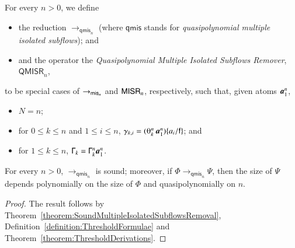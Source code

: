 \newcommand{\frqmis}{{\mathsf{qmis}}}
\newcommand{\QMISR}{\mathsf{QMISR}}
\begin{definition}\label{definition:QuasipolynomialMultipleSubflowRemoval}
For every $n>0$, we define
\begin{itemize}
\item the reduction ${\to_{\frqmis_n}}$ (where $\frqmis$ stands for \emph{quasipolynomial multiple isolated subflows}); and
\item and the operator the \emph{Quasipolynomial Multiple Isolated Subflows Remover}, $\QMISR_n$,
\end{itemize}
to be special cases of ${\to_{{\mathsf{mis}}_n}}$ and $\mathsf{MISR}_n$, respectively, such that, given atoms ${\boldsymbol a}_{1}^{n}$,
\begin{itemize}
\item $N=n$;
\item for $0\le k\le n$ and $1\le i\le n$, $\gamma_{k,i}=(\th kn\avec1n)\{a_i/\fff\}$; and
\item for $1\le k\le n$, $\mathsf\Gamma_k=\mathsf\Gamma^n_k{\boldsymbol a}_{1}^{n}$.
\end{itemize}
\end{definition}

\begin{theorem}\label{theorem:SoundQuasipolynomialMultipleSubflowsRemoval}
For every $n>0$, $\to_{\frqmis_n}$ is sound; moreover, if\/ $\Phi\to_{\frqmis_n}\Psi$, then the size of $\Psi$ depends polynomially on the size of $\Phi$ and quasipolynomially on $n$.
\end{theorem}

\begin{proof}
The result follows by Theorem~\vref{theorem:SoundMultipleIsolatedSubflowsRemoval}, Definition~\vref{definition:ThresholdFormulae} and Theorem~\vref{theorem:ThresholdDerivations}.
\end{proof}


